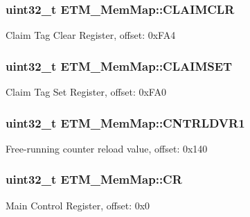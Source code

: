 \subsubsection[{C\+L\+A\+I\+M\+C\+L\+R}]{\setlength{\rightskip}{0pt plus 5cm}uint32\+\_\+t E\+T\+M\+\_\+\+Mem\+Map\+::\+C\+L\+A\+I\+M\+C\+L\+R}\label{struct_e_t_m___mem_map_a7e03dd9e31abcfe824f7b81b3cd4207f}
Claim Tag Clear Register, offset\+: 0x\+F\+A4 \hypertarget{struct_e_t_m___mem_map_a410e895c96250842d992c62e914062ab}{}
\subsubsection[{C\+L\+A\+I\+M\+S\+E\+T}]{\setlength{\rightskip}{0pt plus 5cm}uint32\+\_\+t E\+T\+M\+\_\+\+Mem\+Map\+::\+C\+L\+A\+I\+M\+S\+E\+T}\label{struct_e_t_m___mem_map_a410e895c96250842d992c62e914062ab}
Claim Tag Set Register, offset\+: 0x\+F\+A0 \hypertarget{struct_e_t_m___mem_map_aa83f53db92961a712ee31a8b810f0fad}{}
\subsubsection[{C\+N\+T\+R\+L\+D\+V\+R1}]{\setlength{\rightskip}{0pt plus 5cm}uint32\+\_\+t E\+T\+M\+\_\+\+Mem\+Map\+::\+C\+N\+T\+R\+L\+D\+V\+R1}\label{struct_e_t_m___mem_map_aa83f53db92961a712ee31a8b810f0fad}
Free-\/running counter reload value, offset\+: 0x140 \hypertarget{struct_e_t_m___mem_map_a1073427a5d49856222f104cfccad7dc9}{}
\subsubsection[{C\+R}]{\setlength{\rightskip}{0pt plus 5cm}uint32\+\_\+t E\+T\+M\+\_\+\+Mem\+Map\+::\+C\+R}\label{struct_e_t_m___mem_map_a1073427a5d49856222f104cfccad7dc9}
Main Control Register, offset\+: 0x0 \hypertarget{struct_e_t_m___mem_map_a860e1c89b58a257cd4783a2c488360ee}{}
